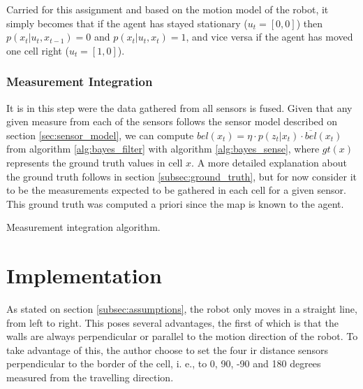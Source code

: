 \documentclass[runningheads]{llncs}
\begin{document}
Carried for this assignment and based on the motion model of the robot, it simply becomes that if the agent has stayed stationary ($u_t = [0, 0]$) then $p(x_t \vert u_t, x_{t-1}) = 0$ and $p(x_t \vert u_t, x_t) = 1$, and vice versa if the agent has moved one cell right ($u_t = [1, 0]$).

\subsubsection{Measurement Integration}

It is in this step were the data gathered from all sensors is fused. Given that any given measure from each of the sensors follows the sensor model described on section \ref{sec:sensor_model}, we can compute $bel(x_t) = \eta \cdot p(z_t \vert x_t) \cdot \overline{bel}(x_t)$ from algorithm \ref{alg:bayes_filter} with algorithm \ref{alg:bayes_sense}, where $gt(x)$ represents the ground truth values in cell $x$. A more detailed explanation about the ground truth follows in section \ref{subsec:ground_truth}, but for now consider it to be the measurements expected to be gathered in each cell for a given sensor. This ground truth was computed a priori since the map is known to the agent.

\begin{algorithm}[!ht]
    \DontPrintSemicolon



\caption{Measurement integration algorithm.}
\label{alg:bayes_sense}
\end{algorithm}
\FloatBarrier



\section{Implementation}
\label{sec:implementation}

As stated on section \ref{subsec:assumptions}, the robot only moves in a straight line, from left to right. This poses several advantages, the first of which is that the walls are always perpendicular or parallel to the motion direction of the robot. To take advantage of this, the author choose to set the four \gls{ir} distance sensors perpendicular to the border of the cell, i. e., to 0, 90, -90 and 180 degrees measured from the travelling direction.
\end{document}
